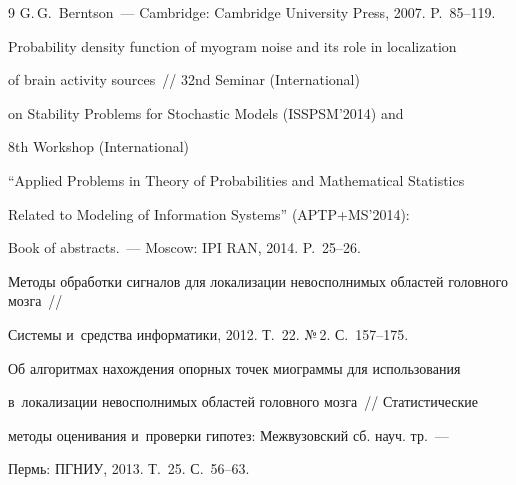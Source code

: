 {{\begin{thebibliography}{9}
G.\,G.~Berntson~--- Cambridge: Cambridge University Press, 2007. P.~85--119.









Probability density function of myogram noise and its role in localization


of brain activity sources~/\!\!/ 32nd Seminar (International)


on Stability Problems for Stochastic Models (ISSPSM'2014) and


8th  Workshop (International)


``Applied Problems in Theory of Probabilities and Mathematical Statistics


Related to Modeling of Information Systems'' (APTP\;+\;MS'2014):


Book of abstracts.~--- Moscow: IPI RAN, 2014. P.~25--26.









Методы обработки сигналов для локализации невосполнимых областей головного мозга~/\!\!/


Системы и~средства информатики, 2012. Т.~22. №\,2. С.~157--175.






Об алгоритмах нахождения опорных точек миограммы для использования


в~локализации невосполнимых областей головного мозга~/\!\!/ Статистические


методы оценивания и~проверки гипотез: Межвузовский сб. науч. тр.~---


Пермь: ПГНИУ, 2013. Т.~25. С.~56--63.


\end{thebibliography}


} }








\vspace*{-9pt}





